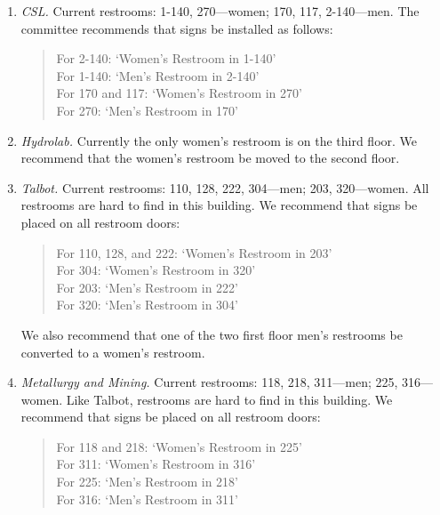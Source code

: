 \begin{enumerate}
\item
{\em CSL.}
Current restrooms:
1-140, 270---women;
170, 117, 2-140---men.
The committee recommends that signs be installed as follows:

\begin{quote}
For 2-140:  `Women's Restroom in 1-140' \\
For 1-140:  `Men's Restroom in 2-140' \\
For 170 and 117:  `Women's Restroom in 270'\\
For 270:  `Men's Restroom in 170' \\
 
\end{quote}


\item
{\em Hydrolab.}
Currently the only women's restroom is on 
the third floor.  We recommend that the women's
restroom be moved to the second floor.

\item
{\em Talbot.}
Current restrooms:
110, 128, 222, 304---men;
203, 320---women.
All restrooms are hard to find in this building.  We
recommend that signs be placed on all restroom doors:

\begin{quote}
For 110, 128, and 222:  `Women's Restroom in 203' \\
For 304:  `Women's Restroom in 320'\\
For 203:  `Men's Restroom in 222'\\
For 320:  `Men's Restroom in 304'
\end{quote}
 
We also recommend that one of the two first floor men's
restrooms be converted to a women's restroom.




\item
{\em Metallurgy and Mining.}
Current restrooms:
118, 218, 311---men;
225, 316---women.
Like Talbot, restrooms are hard to find in this building.
We recommend that signs be placed on all restroom doors:

\begin{quote}
For 118 and 218:  `Women's Restroom in 225' \\
For 311:  `Women's Restroom in 316'\\
For 225:  `Men's Restroom in 218'\\
For 316:  `Men's Restroom in 311'
\end{quote}
 



\end{enumerate}
